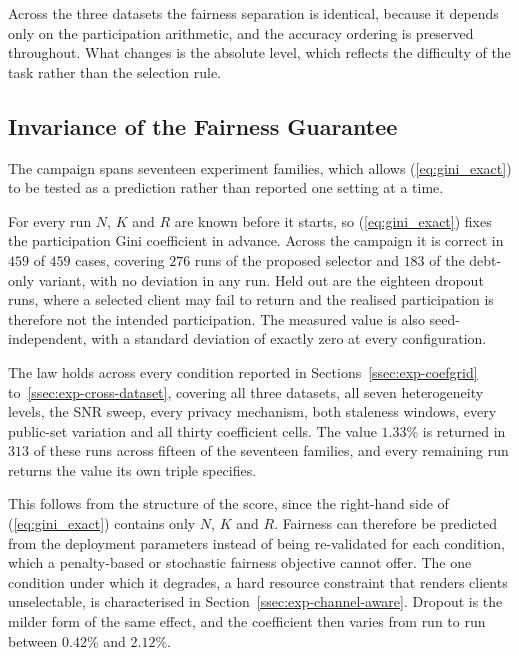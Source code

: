 \documentclass[journal]{IEEEtran}
\newcommand{\rev}[1]{#1}
\begin{document}
\rev{Across the three datasets the fairness separation is identical, because it depends only on the participation arithmetic, and the accuracy ordering is preserved throughout. What changes is the absolute level, which reflects the difficulty of the task rather than the selection rule.}

\subsection{Invariance of the Fairness Guarantee}
\label{ssec:exp-invariance}

\rev{The campaign spans seventeen experiment families, which allows (\ref{eq:gini_exact}) to be tested as a prediction rather than reported one setting at a time.}

\rev{For every run $N$, $K$ and $R$ are known before it starts, so (\ref{eq:gini_exact}) fixes the participation Gini coefficient in advance. Across the campaign it is correct in $459$ of $459$ cases, covering $276$ runs of the proposed selector and $183$ of the debt-only variant, with no deviation in any run. Held out are the eighteen dropout runs, where a selected client may fail to return and the realised participation is therefore not the intended participation. The measured value is also seed-independent, with a standard deviation of exactly zero at every configuration.}

\rev{The law holds across every condition reported in Sections~\ref{ssec:exp-coefgrid} to~\ref{ssec:exp-cross-dataset}, covering all three datasets, all seven heterogeneity levels, the SNR sweep, every privacy mechanism, both staleness windows, every public-set variation and all thirty coefficient cells. The value $1.33\%$ is returned in $313$ of these runs across fifteen of the seventeen families, and every remaining run returns the value its own triple specifies.}

\rev{This follows from the structure of the score, since the right-hand side of (\ref{eq:gini_exact}) contains only $N$, $K$ and $R$. Fairness can therefore be predicted from the deployment parameters instead of being re-validated for each condition, which a penalty-based or stochastic fairness objective cannot offer. The one condition under which it degrades, a hard resource constraint that renders clients unselectable, is characterised in Section~\ref{ssec:exp-channel-aware}. Dropout is the milder form of the same effect, and the coefficient then varies from run to run between $0.42\%$ and $2.12\%$.}
\end{document}
